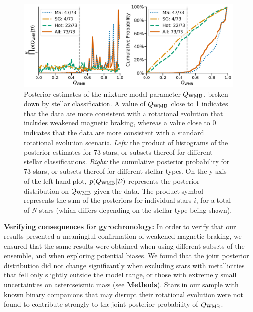 \documentclass[12pt]{article}
\begin{document}
\begin{figure}
	\centering
	\includegraphics[width=\textwidth]{modelresults.pdf}
	\caption{Posterior estimates of the mixture model parameter $Q_{\rm WMB}$, broken down by stellar classification. A value of $Q_{\rm WMB}$ close to 1 indicates that the data are more consistent with a rotational evolution that includes weakened magnetic braking, whereas a value close to 0 indicates that the data are more consistent with a standard rotational evolution scenario. \textit{Left:} the product of histograms of the posterior estimates for 73 stars, or subsets thereof for different stellar classifications. \textit{Right:} the cumulative posterior probability for 73 stars, or subsets thereof for different stellar types. On the y-axis of the left hand plot, $p(Q_{\rm WMB} | \mathcal{D})$ represents the posterior distribution on $Q_{\rm WMB}$ given the data. The product symbol represents the sum of the posteriors for individual stars $i$, for a total of $N$ stars (which differs depending on the stellar type being shown).}
	\label{fig:gyroresults}
\end{figure}

\textbf{Verifying consequences for gyrochronology:} In order to verify that our results presented a meaningful confirmation of weakened magnetic braking, we ensured that the same results were obtained when using different subsets of the ensemble, and when exploring potential biases. We found that the joint posterior distribution did not change significantly when excluding stars with metallicities that fell only slightly outside the model range, or those with extremely small uncertainties on asteroseismic mass (see \textbf{Methods}). Stars in our sample with known binary companions that may disrupt their rotational evolution were not found to contribute strongly to the joint posterior probability of $Q_{\rm WMB}$. 
\end{document}

